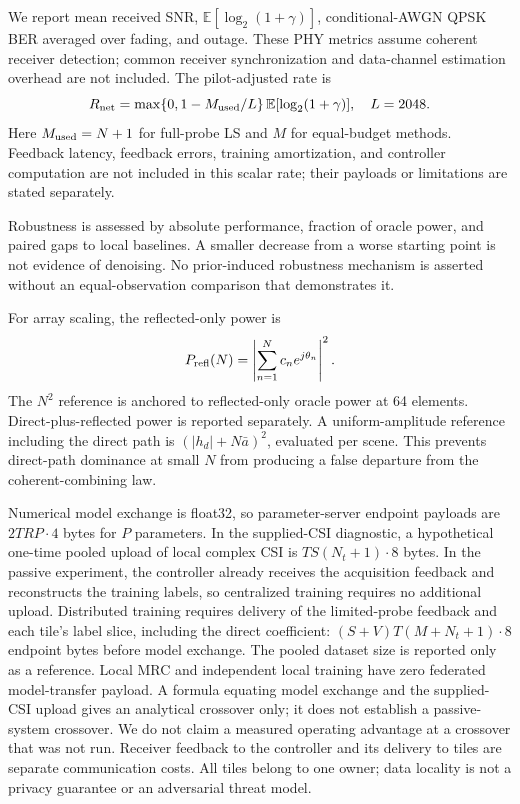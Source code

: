 \documentclass[journal]{IEEEtran}
\begin{document}
We report mean received SNR, $\mathbb{E}[\log_2(1+\gamma)]$, conditional-AWGN QPSK BER averaged over fading, and outage. These PHY metrics assume coherent receiver detection; common receiver synchronization and data-channel estimation overhead are not included. The pilot-adjusted rate is
\begin{equation}
 R_{\rm net}=\max\{0,1-M_{\rm used}/L\}\,
             \mathbb{E}[\log_2(1+\gamma)],\quad L=2048.
\end{equation}
Here $M_{\rm used}=N+1$ for full-probe LS and $M$ for equal-budget methods. Feedback latency, feedback errors, training amortization, and controller computation are not included in this scalar rate; their payloads or limitations are stated separately.

Robustness is assessed by absolute performance, fraction of oracle power, and paired gaps to local baselines. A smaller decrease from a worse starting point is not evidence of denoising. No prior-induced robustness mechanism is asserted without an equal-observation comparison that demonstrates it.

For array scaling, the reflected-only power is
\begin{equation}
 P_{\rm refl}(N)=\left|\sum_{n=1}^N c_ne^{j\theta_n}\right|^2.
\end{equation}
The $N^2$ reference is anchored to reflected-only oracle power at 64 elements. Direct-plus-reflected power is reported separately. A uniform-amplitude reference including the direct path is $(|h_d|+N\bar a)^2$, evaluated per scene. This prevents direct-path dominance at small $N$ from producing a false departure from the coherent-combining law.

Numerical model exchange is float32, so parameter-server endpoint payloads are $2TRP\cdot4$ bytes for $P$ parameters. In the supplied-CSI diagnostic, a hypothetical one-time pooled upload of local complex CSI is $TS(N_t+1)\cdot8$ bytes. In the passive experiment, the controller already receives the acquisition feedback and reconstructs the training labels, so centralized training requires no additional upload. Distributed training requires delivery of the limited-probe feedback and each tile's label slice, including the direct coefficient: $(S+V)T(M+N_t+1)\cdot8$ endpoint bytes before model exchange. The pooled dataset size is reported only as a reference. Local MRC and independent local training have zero federated model-transfer payload. A formula equating model exchange and the supplied-CSI upload gives an analytical crossover only; it does not establish a passive-system crossover. We do not claim a measured operating advantage at a crossover that was not run. Receiver feedback to the controller and its delivery to tiles are separate communication costs. All tiles belong to one owner; data locality is not a privacy guarantee or an adversarial threat model.
\end{document}
